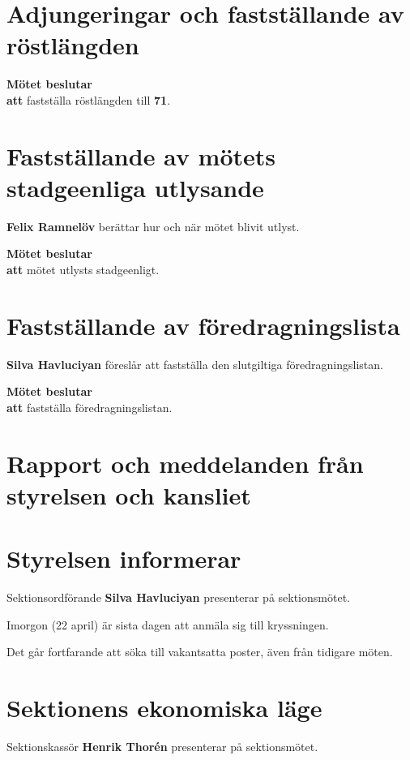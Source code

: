 \documentclass{datateknologsektionen-document}
\newcommand{\ind}{\hspace*{2em}}
\newcommand{\motetbeslutar}{\textbf{Mötet beslutar}}
\newcommand{\att}{\\\ind\textbf{att}}
\newcommand{\rostlangd}[1]{\motetbeslutar\att{} fastställa röstlängden till \textbf{#1}.}
\begin{document}
\section{Adjungeringar och fastställande av röstlängden}



\rostlangd{71}



\section{Fastställande av mötets stadgeenliga utlysande}
\textbf{Felix Ramnelöv} berättar hur och när mötet blivit utlyst.

\motetbeslutar\att{} mötet utlysts stadgeenligt.



\section{Fastställande av föredragningslista}

\textbf{Silva Havluciyan} föreslår att fastställa den slutgiltiga föredragningslistan.

\motetbeslutar\att{} fastställa föredragningslistan.
\pagebreak


\section{Rapport och meddelanden från styrelsen och kansliet}



\section{Styrelsen informerar}

Sektionsordförande \textbf{Silva Havluciyan} presenterar på sektionsmötet.

Imorgon (22 april) är sista dagen att anmäla sig till kryssningen.

Det går fortfarande att söka till vakantsatta poster, även från tidigare möten.

\section{Sektionens ekonomiska läge}
Sektionskassör \textbf{Henrik Thorén} presenterar på sektionsmötet.
\end{document}
